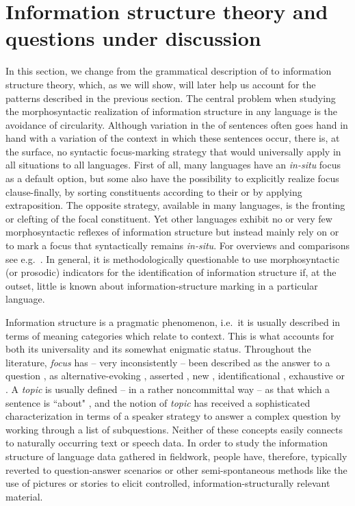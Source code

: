 \documentclass[output=paper
,modfonts
,nonflat]{langsci/langscibook}
\begin{document}
\section{Information structure theory and questions under discussion}\label{sect:theory}

In this section, we change from the grammatical description of  to information structure theory, which, as we will show, will later help us account for the patterns described in the previous section. The central problem when studying the morphosyntactic realization of information structure in any language is the avoidance of circularity. Although variation in the  of sentences often goes hand in hand with a variation of the  context in which these sentences occur, there is, at the surface, no syntactic focus-marking strategy that would universally apply in all situations to all languages. First of all, many languages have an \textit{in-situ} focus as a default option, but some also have the possibility to explicitly realize focus clause-finally, by sorting constituents according to their  or by applying extraposition. The opposite strategy, available in many languages, is the fronting or clefting of the focal constituent. Yet other languages exhibit no or very few morphosyntactic reflexes of information structure but instead mainly rely on  or  to mark a focus that syntactically remains \textit{in-situ}. For overviews and comparisons see e.g.\ \citet{zubma98,bueda09,skost10,gueto15,ferca16}. In general, it is methodologically questionable to use morphosyntactic (or prosodic) indicators for the identification of information structure if, at the outset, little is known about information-structure marking in a particular language.

\newpage 
Information structure is a pragmatic phenomenon, i.e.\ it is usually described in terms of meaning categories which relate to context. This is what accounts for both its universality and its somewhat enigmatic status. Throughout the literature, \textit{focus} has -- very inconsistently -- been described as the answer to a question \citep{pauhe80, halmi67, robcr12}, as alternative-evoking \citep{rooma92}, asserted \citep{Lambrecht1994}, new \citep{halmi67, schro99}, identificational \citep{ekika98},  exhaustive \citep{rooro08} or  \citep{katjo11}. A \textit{topic} is usually defined -- in a rather noncommittal way -- as that which a sentence is ``about" \citep{hocch58, strpe64, reita81, mcnlo98, jacjo01, Krifka2008}, and the notion of \textit{ topic} has received a sophisticated characterization in terms of a speaker strategy \citep{bueda03} to answer a complex question by working through a list of subquestions. Neither of these concepts easily connects to naturally occurring text or speech data. In order to study the information structure of language data gathered in fieldwork, people have, therefore, typically reverted to question-answer scenarios or other semi-spontaneous methods like the use of pictures or stories \citep[cf.][]{skost06} to elicit controlled, information-structurally relevant material.
\end{document}
